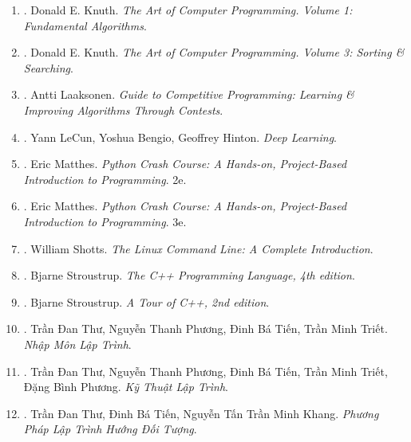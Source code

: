 \documentclass{article}
\begin{document}
\begin{enumerate}
	\item \cite{Knuth1997}. Donald E. Knuth. \textit{The Art of Computer Programming. Volume 1: Fundamental Algorithms}.\hfill{}
	\item \cite{Knuth1998}. Donald E. Knuth. \textit{The Art of Computer Programming. Volume 3: Sorting \& Searching}.\hfill{}
	\item \cite{Laaksonen2020}. Antti Laaksonen. \textit{Guide to Competitive Programming: Learning \& Improving Algorithms Through Contests}.\\\mbox{}\hfill{}
	\item \cite{LeCun_Bengio_Hinton2015}. Yann LeCun, Yoshua Bengio, Geoffrey Hinton. \textit{Deep Learning}.\hfill{}
	\item \cite{Matthes2019}. Eric Matthes. \textit{Python Crash Course: A Hands-on, Project-Based Introduction to Programming}. 2e.\\\mbox{}\hfill{}
	\item \cite{Matthes2023}. Eric Matthes. \textit{Python Crash Course: A Hands-on, Project-Based Introduction to Programming}. 3e.\\\mbox{}\hfill{}
	\item \cite{Shotts2019}. William Shotts. \textit{The Linux Command Line: A Complete Introduction}.\hfill{}
	\item \cite{Stroustrup2013}. Bjarne Stroustrup. \textit{The C++ Programming Language, 4th edition}.\hfill{}
	\item \cite{Stroustrup2018}. Bjarne Stroustrup. \textit{A Tour of C++, 2nd edition}.\hfill{}
	\item \cite{Thu_Phuong_Tien_Triet_NMLT}. Trần Đan Thư, Nguyễn Thanh Phương, Đinh Bá Tiến, Trần Minh Triết. \textit{Nhập Môn Lập Trình}.\\\mbox{}\hfill{}
	\item \cite{Thu_Phuong_Tien_Triet_Phuong_KTLT}. Trần Đan Thư, Nguyễn Thanh Phương, Đinh Bá Tiến, Trần Minh Triết, Đặng Bình Phương. \textit{Kỹ Thuật Lập Trình}.\hfill{}
	\item \cite{Thu_Tien_Khang_PPLTHDT}. Trần Đan Thư, Đinh Bá Tiến, Nguyễn Tấn Trần Minh Khang. \textit{Phương Pháp Lập Trình Hướng Đối Tượng}.\\\mbox{}\hfill{}
\end{enumerate}
\end{document}
